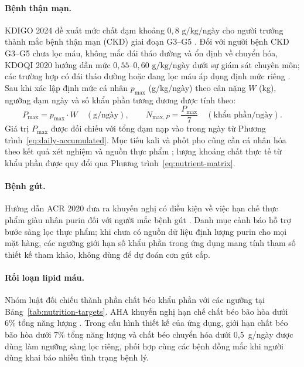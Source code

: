 \paragraph{Bệnh thận mạn.}
KDIGO 2024 đề xuất mức chất đạm khoảng $0{,}8\text{ g/kg/ngày}$ cho người trưởng thành mắc bệnh thận mạn (CKD) giai đoạn G3--G5 \cite{kdigo2024clinical}. Đối với người bệnh CKD G3--G5 chưa lọc máu, không mắc đái tháo đường và ổn định về chuyển hóa, KDOQI 2020 hướng dẫn mức $0{,}55\text{--}0{,}60\text{ g/kg/ngày}$ dưới sự giám sát chuyên môn; các trường hợp có đái tháo đường hoặc đang lọc máu áp dụng định mức riêng \cite{nkfKdoqiNutrition2020}. Sau khi xác lập định mức cá nhân $p_{\mathrm{max}}$ (g/kg/ngày) theo cân nặng $W$ (kg), ngưỡng đạm ngày và số khẩu phần tương đương được tính theo:
\begin{equation}
    P_{\mathrm{max}} = p_{\mathrm{max}} \cdot W \quad (\mathrm{g/ngày}), \qquad
    N_{\mathrm{max}, P} = \frac{P_{\mathrm{max}}}{7} \quad (\text{khẩu phần/ngày}).
    \label{eq:ckd-protein-limit}
\end{equation}
Giá trị $P_{\mathrm{max}}$ được đối chiếu với tổng đạm nạp vào trong ngày từ Phương trình~\eqref{eq:daily-accumulated}. Mục tiêu kali và phốt pho cũng cần cá nhân hóa theo kết quả xét nghiệm và nguồn thực phẩm \cite{nkfKdoqiNutrition2020}; lượng khoáng chất thực tế từ khẩu phần được quy đổi qua Phương trình~\eqref{eq:nutrient-matrix}.

\paragraph{Bệnh gút.}
Hướng dẫn ACR 2020 đưa ra khuyến nghị có điều kiện về việc hạn chế thực phẩm giàu nhân purin đối với người mắc bệnh gút \cite{acrGout2020}. Danh mục cảnh báo hỗ trợ bước sàng lọc thực phẩm; khi chưa có nguồn dữ liệu định lượng purin cho mọi mặt hàng, các ngưỡng giới hạn số khẩu phần trong ứng dụng mang tính tham số thiết kế tham khảo, không dùng để dự đoán cơn gút cấp.

\paragraph{Rối loạn lipid máu.}
Nhóm luật đối chiếu thành phần chất béo khẩu phần với các ngưỡng tại Bảng~\ref{tab:nutrition-targets}. AHA khuyến nghị hạn chế chất béo bão hòa dưới 6\% tổng năng lượng \cite{ahaSaturatedFat}. Trong cấu hình thiết kế của ứng dụng, giới hạn chất béo bão hòa dưới 7\% tổng năng lượng và chất béo chuyển hóa dưới 0,5~g/ngày được dùng làm ngưỡng sàng lọc riêng, phối hợp cùng các bệnh đồng mắc khi người dùng khai báo nhiều tình trạng bệnh lý.

